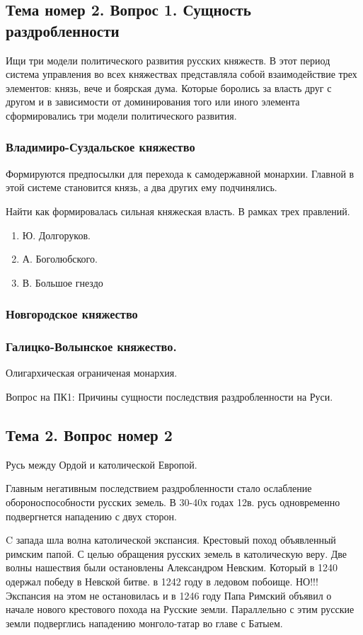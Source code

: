 \documentclass[a4paper]{article}
\begin{document}
\subsection{Тема номер 2. Вопрос 1. Сущность раздробленности}
Ищи три модели политического развития русских княжеств.
В этот период система управления во всех княжествах представляла собой взаимодействие трех элементов: князь, вече и боярская дума. Которые боролись за власть друг с другом и в зависимости от доминирования того или иного элемента сформировались три модели политического развития.

\subsubsection{Владимиро-Суздальское княжество}
Формируются предпосылки для перехода к самодержавной монархии. Главной в этой системе становится князь, а два других ему подчинялись.

Найти как формировалась сильная княжеская власть. В рамках трех правлений.
\begin{enumerate}
\item Ю. Долгоруков.
\item А. Боголюбского.
\item В. Большое гнездо
\end{enumerate}

\subsubsection{Новгородское княжество}

\subsubsection{Галицко-Волынское княжество.}
Олигархическая ограниченая монархия.

Вопрос на ПК1: Причины сущности последствия раздробленности на Руси.

\subsection{Тема 2. Вопрос номер 2}
Русь между Ордой и католической Европой.

Главным негативным последствием раздробленности стало ослабление обороноспособности русских земель.
В 30-40х годах 12в. русь одновременно подвергнется нападению с двух сторон.

C запада шла волна католической экспансия. Крестовый поход объявленный римским папой. С целью обращения русских земель в католическую веру. Две волны нашествия были остановлены Александром Невским. Который в 1240 одержал победу в Невской битве. в 1242 году в ледовом побоище. НО!!! Экспансия на этом не остановилась и в 1246 году Папа Римский объявил о начале нового крестового похода на Русские земли. Параллельно с этим русские земли подверглись нападению монголо-татар во главе с Батыем.
\end{document}
